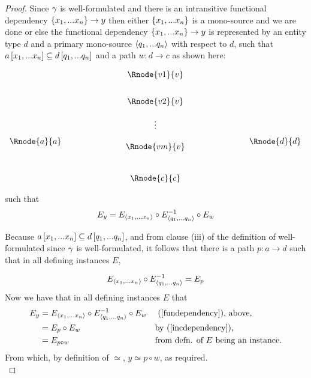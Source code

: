 \begin{proof}
Since $\gamma$ is well-formulated  and there is an intransitive functional dependency $\left\{x_1,...x_n\right\} \rightarrow y$ then either $\left\{x_1,...x_n\right\}$ is a mono-source and we are done or else the functional dependency
$\left\{x_1,...x_n\right\} \rightarrow y$   is represented 
by  an entity type $d$ and 
a primary mono-source $\langle q_1,...q_n\rangle$ with respect to
$d$, such that $a\left[x_1,...x_n\right]\subseteq d\left[q_1,...q_n\right]$ and a 
path $w:d\rightarrow c$ as shown here:

\setlength{\arraycolsep}{.2cm}
\begin{center}
$
\begin{array}{cp{2cm}c p{2cm} c}
             &  & \Rnode{v1}{\veee} & &               \\ [0.7cm]
						 &  & \Rnode{v2}{\veee} & &               \\ [0.4cm]
						 &  &     \vdots      & &               \\ [0.2cm]
\Rnode{a}{a} &  &                 & & \Rnode{d}{d}  \\ [-0.2cm]
             &  & \Rnode{vm}{\veee} & &               \\ [0.9cm]
             &  & \Rnode{c}{c}    & &               \\
\end{array}
$
\end{center}
such that
\begin{equation}
\label{fundependency}
E_y = E_{\langle x_1,...x_n\rangle} \circ E_{\langle q_1,...q_n\rangle}^{-1} \circ E_w
\end{equation}

Because $a\left[x_1,...x_n\right]\subseteq d\left[q_1,...q_n\right]$,  and from
clause (iii) of the definition of well-formulated since $\gamma$ is well-formulated, it follows that
there  is a  path $p:a \rightarrow d$ such
that 
in all defining instances $E$,

\begin{equation}
\label{incdependency}
E_{\langle x_1,...x_n\rangle} \circ E^{-1}_{\langle q_1,...q_n\rangle} = E_p
\end{equation}
Now we have  that in all defining instances $E$ that 
\begin{align*}
E_y &= E_{\langle x_1,...x_n\rangle} \circ E_{\langle q_1,...q_n\rangle}^{-1} \circ E_w  && \text{ (\ref{fundependency}), above,}\\
    &= E_p \circ E_w                                   && \text{by (\ref{incdependency}),}\\
		&= E_{p \circ w}                                   && \text{from defn. of $E$ being an instance.}\\
\end{align*} 
\vspace{-0.3cm}
From which, by definition of $\simeq$, $y\simeq p \circ w$, as required. \\


\end{proof}
